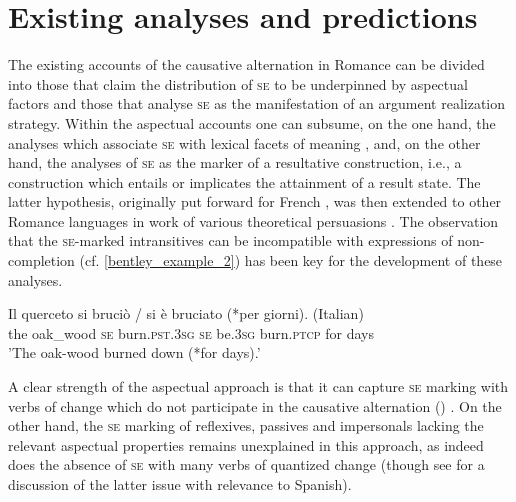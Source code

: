 \documentclass[output=paper,colorlinks,citecolor=brown
]{langscibook}
\begin{document}
\section{Existing analyses and predictions}
\label{bentley_section_2}
The existing accounts of the causative alternation in Romance can be divided into those that claim the distribution of \textsc{se} to be underpinned by aspectual factors and those that analyse \textsc{se} as the manifestation of an argument realization strategy. Within the aspectual accounts one can subsume, on the one hand, the analyses which associate \textsc{se} with lexical facets of meaning \citep{cennamo2012aspectual,cennamo2015valency,cennamo2021anticausatives,vivanco2021scalar}, and, on the other hand, the analyses of \textsc{se} as the marker of a resultative construction, i.e., a construction which entails or implicates the attainment of a result state. The latter hypothesis, originally put forward for French \citep{zribi1987reflexivite}, was then extended to other Romance languages in work of various theoretical persuasions \citep{jezek2003classi,folli2002constructing,folli2005consuming,manente2008laspect,labelle2010anticausative,cennamo2011anticausative,cennamo2012aspectual}. The observation that the \textsc{se}-marked intransitives can be incompatible with expressions of non-completion (cf. \ref{bentley_example_2}) has been key for the development of these analyses.

\ea  \label{bentley_example_2}
\gll
Il querceto si bruciò / si è bruciato {(*per giorni)}. (Italian) \\
the	oak\_wood \textsc{se} burn.\textsc{pst}.3\textsc{sg} {} \textsc{se} be.3\textsc{sg} burn.\textsc{ptcp} {for days} {} \\
\glt
'The oak-wood burned down (*for days).’ \citep[401]{cennamo2012aspectual}
\z

A clear strength of the aspectual approach is that it can capture \textsc{se} marking with verbs of change which do not participate in the causative alternation () \citep{miguel2000operador,acedomatellan2022argument}. On the other hand, the \textsc{se} marking of reflexives, passives and impersonals lacking the relevant aspectual properties remains unexplained in this approach, as indeed does the absence of \textsc{se} with many verbs of quantized change (though see \cite{vivanco2021scalar} for a discussion of the latter issue with relevance to Spanish).
\end{document}
